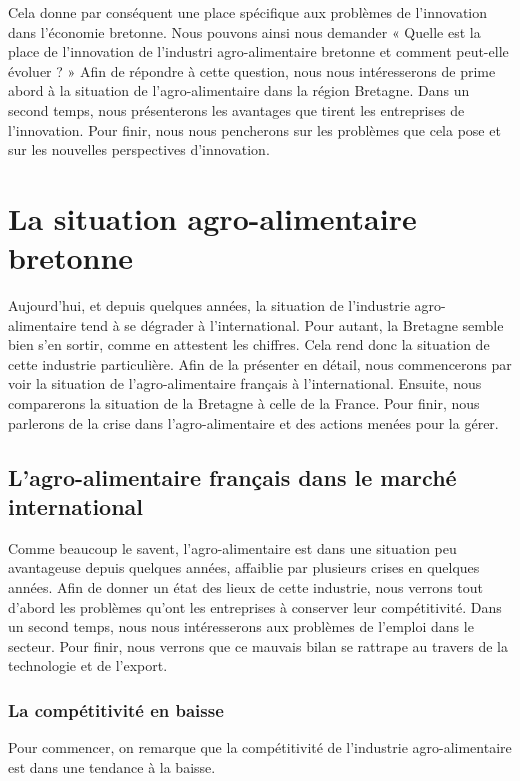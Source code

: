 \documentclass[a4paper,12pt]{report}
\begin{document}
	 Cela donne par conséquent une place spécifique aux problèmes de l'innovation dans l’économie bretonne. Nous pouvons ainsi nous demander « Quelle est la place de l'innovation de l'industri agro-alimentaire bretonne et comment peut-elle évoluer ? » Afin de répondre à cette question, nous nous intéresserons de prime abord à la situation de l’agro-alimentaire dans la région Bretagne. Dans un second temps, nous présenterons les avantages que tirent les entreprises de l'innovation. Pour finir, nous nous pencherons sur les problèmes que cela pose et sur les nouvelles perspectives d'innovation.
	 
\chapter{La situation agro-alimentaire bretonne}
	Aujourd’hui, et depuis quelques années, la situation de l’industrie agro-alimentaire tend à se dégrader à l’international. Pour autant, la Bretagne semble bien s’en sortir, comme en attestent les chiffres. Cela rend donc la situation de cette industrie particulière. Afin de la présenter en détail, nous commencerons par voir la situation de l’agro-alimentaire français à l’international. Ensuite, nous comparerons la situation de la Bretagne à celle de la France. Pour finir, nous parlerons de la crise dans l’agro-alimentaire et des actions menées pour la gérer.

	\section{L’agro-alimentaire français dans le marché international}
		Comme beaucoup le savent, l’agro-alimentaire est dans une situation peu avantageuse depuis quelques années, affaiblie par plusieurs crises en quelques années. Afin de donner un état des lieux de cette industrie, nous verrons tout d’abord les problèmes qu’ont les entreprises à conserver leur compétitivité. Dans un second temps, nous nous intéresserons aux problèmes de l’emploi dans le secteur. Pour finir, nous verrons que ce mauvais bilan se rattrape au travers de la technologie et de l’export.

		\subsection{La compétitivité en baisse}
			Pour commencer, on remarque que la compétitivité de l’industrie agro-alimentaire est dans une tendance à la baisse.
			
\end{document}
